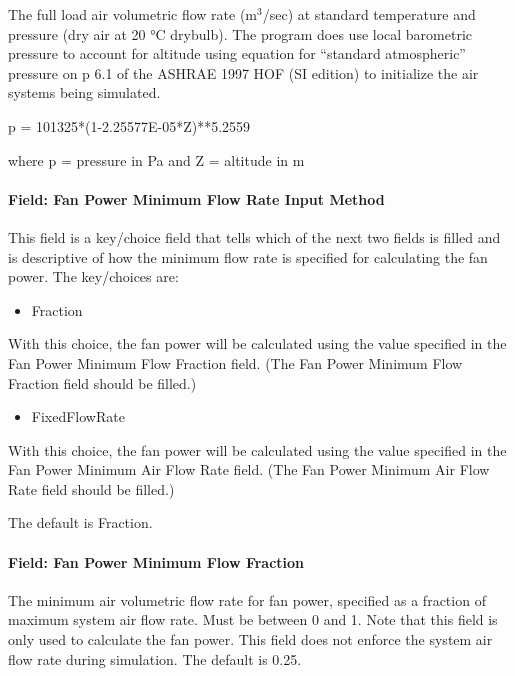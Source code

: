 The full load air volumetric flow rate (m\(^{3}\)/sec) at standard temperature and pressure (dry air at 20 °C drybulb). The program does use local barometric pressure to account for altitude using equation for ``standard atmospheric'' pressure on p 6.1 of the ASHRAE 1997 HOF (SI edition) to initialize the air systems being simulated.

p = 101325*(1-2.25577E-05*Z)**5.2559

where p = pressure in Pa and Z = altitude in m

\paragraph{Field: Fan Power Minimum Flow Rate Input Method}\label{field-fan-power-minimum-flow-rate-input-method}

This field is a key/choice field that tells which of the next two fields is filled and is descriptive of how the minimum flow rate is specified for calculating the fan power. The key/choices are:

\begin{itemize}
\tightlist
\item
  Fraction
\end{itemize}

With this choice, the fan power will be calculated using the value specified in the Fan Power Minimum Flow Fraction field. (The Fan Power Minimum Flow Fraction field should be filled.)

\begin{itemize}
\tightlist
\item
  FixedFlowRate
\end{itemize}

With this choice, the fan power will be calculated using the value specified in the Fan Power Minimum Air Flow Rate field. (The Fan Power Minimum Air Flow Rate field should be filled.)

The default is Fraction.

\paragraph{Field: Fan Power Minimum Flow Fraction}\label{field-fan-power-minimum-flow-fraction}

The minimum air volumetric flow rate for fan power, specified as a fraction of maximum system air flow rate. Must be between 0 and 1. Note that this field is only used to calculate the fan power. This field does not enforce the system air flow rate during simulation. The default is 0.25.

